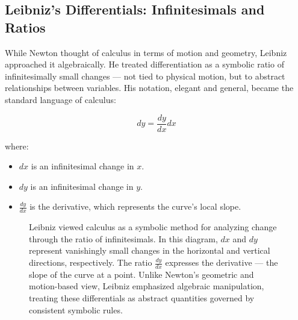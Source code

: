 \subsection{Leibniz’s Differentials: Infinitesimals and Ratios}  

While Newton thought of calculus in terms of motion and geometry, Leibniz approached it algebraically. He treated differentiation as a symbolic ratio of infinitesimally small changes — not tied to physical motion, but to abstract relationships between variables. His notation, elegant and general, became the standard language of calculus:

\[
dy = \frac{dy}{dx} dx
\]

where:  
\begin{itemize}
    \item \( dx \) is an infinitesimal change in \( x \).  
    \item \( dy \) is an infinitesimal change in \( y \).  
    \item \( \frac{dy}{dx} \) is the derivative, which represents the curve’s local slope.  
\end{itemize}  

\begin{figure}[H]
\centering
{}

\vspace{0.5em}
\caption{\small Leibniz viewed calculus as a symbolic method for analyzing change through the ratio of infinitesimals. In this diagram, $dx$ and $dy$ represent vanishingly small changes in the horizontal and vertical directions, respectively. The ratio $\frac{dy}{dx}$ expresses the derivative — the slope of the curve at a point. Unlike Newton's geometric and motion-based view, Leibniz emphasized algebraic manipulation, treating these differentials as abstract quantities governed by consistent symbolic rules.}
\end{figure}

